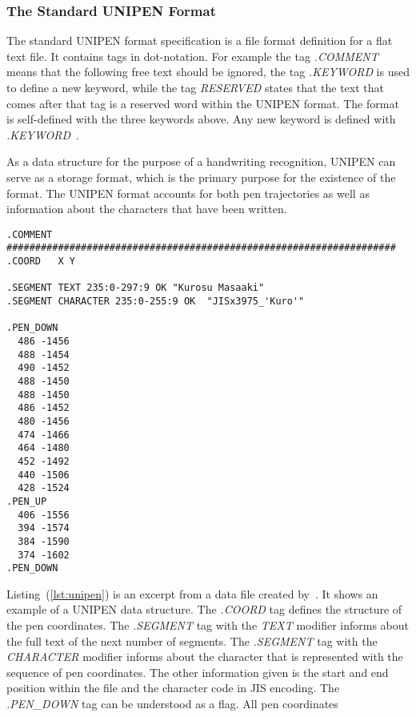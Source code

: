 \subsubsection{The Standard UNIPEN Format}
\label{sec:hwre:standardunipenformat}

The standard UNIPEN format specification is a file format definition for a flat
text file. It contains tags in dot-notation. For example the tag \emph{.COMMENT}
means that the following free text should be ignored, the tag \emph{.KEYWORD} 
is used to define a new keyword, while the tag \emph{RESERVED} states that
the text that comes after that tag is a reserved word within the UNIPEN format.
The format is self-defined with the three keywords above. Any new keyword is
defined with \emph{.KEYWORD}~.

As a data structure for the purpose of a handwriting recognition, UNIPEN can 
serve as a storage format, which is the primary purpose for the existence of the
format. The UNIPEN format accounts for both pen trajectories as well as 
information about the characters that have been written.
\begin{texcode}
  \begin{lstlisting}[emph={COMMENT,COORD,SEGMENT},emphstyle=\textbf,caption={Demonstration of the \emph{UNIPEN} format},label=lst:unipen]
.COMMENT #################################################################### 
.COORD   X Y

.SEGMENT TEXT 235:0-297:9 OK "Kurosu Masaaki"
.SEGMENT CHARACTER 235:0-255:9 OK  "JISx3975_'Kuro'"

.PEN_DOWN 
  486 -1456 
  488 -1454 
  490 -1452 
  488 -1450 
  488 -1450 
  486 -1452 
  480 -1456 
  474 -1466 
  464 -1480 
  452 -1492 
  440 -1506 
  428 -1524
.PEN_UP 
  406 -1556 
  394 -1574 
  384 -1590 
  374 -1602
.PEN_DOWN 
  \end{lstlisting}
\end{texcode}
Listing~(\ref{lst:unipen}) is an excerpt from a data file created 
by~. It shows an example of a UNIPEN data structure.
The \emph{.COORD} tag defines the structure of the pen coordinates. 
The \emph{.SEGMENT} tag with the \emph{TEXT} modifier informs about the
full text of the next number of segments. The \emph{.SEGMENT} tag with the
\emph{CHARACTER} modifier informs about the character that is represented
with the sequence of pen coordinates. The other information given is the
start and end position within the file and the character code in JIS encoding.
The \emph{.PEN\_DOWN} tag can be understood as a flag. All pen coordinates 
